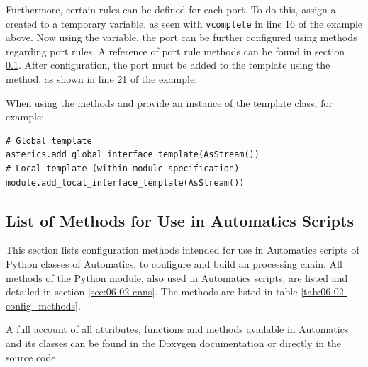 Furthermore, certain rules can be defined for each port.
To do this, assign a created  to a temporary variable, as seen with \texttt{vcomplete} in line 16 of the example above.
Now using the variable, the port can be further configured using methods regarding port rules.
A reference of port rule methods can be found in section \ref{sec:06-02-config_methods}.
After configuration, the port must be added to the template using the  method, as shown in line 21 of the example.

When using the methods  and  provide an instance of the template class, for example:
\begin{lstlisting}[style=AutomaticsPython]
# Global template
asterics.add_global_interface_template(AsStream())
# Local template (within module specification)
module.add_local_interface_template(AsStream())
\end{lstlisting}


\subsection{List of Methods for Use in Automatics Scripts}
\label{sec:06-02-config_methods}

This section lists configuration methods intended for use in Automatics scripts of Python classes of Automatics, to configure and build an \asterics processing chain.
All methods of the  Python module, also used in Automatics scripts, are listed and detailed in section \ref{sec:06-02-cnns}.
The methods are listed in table \ref{tab:06-02-config_methods}.

A full account of all attributes, functions and methods available in Automatics and its classes can be found in the Doxygen documentation or directly in the source code.

